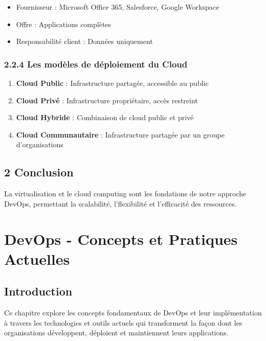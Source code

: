 \documentclass[12pt,a4paper]{report}
\begin{document}
\begin{itemize}
    \item Fournisseur : Microsoft Office 365, Salesforce, Google Workspace
    \item Offre : Applications complètes
    \item Responsabilité client : Données uniquement
\end{itemize}

\subsection{2.2.4 Les modèles de déploiement du Cloud}

\begin{enumerate}
    \item \textbf{Cloud Public} : Infrastructure partagée, accessible au public
    \item \textbf{Cloud Privé} : Infrastructure propriétaire, accès restreint
    \item \textbf{Cloud Hybride} : Combinaison de cloud public et privé
    \item \textbf{Cloud Communautaire} : Infrastructure partagée par un groupe d'organisations
\end{enumerate}

\section{2 Conclusion}

La virtualisation et le cloud computing sont les fondations de notre approche DevOps, permettant la scalabilité, l'flexibilité et l'efficacité des ressources.

\newpage

\chapter{DevOps - Concepts et Pratiques Actuelles}

\section{Introduction}

Ce chapitre explore les concepts fondamentaux de DevOps et leur implémentation à travers les technologies et outils actuels qui transforment la façon dont les organisations développent, déploient et maintiennent leurs applications.
\end{document}

